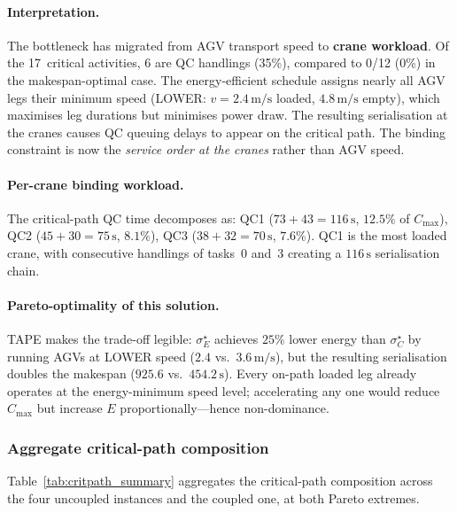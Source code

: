 \documentclass[11pt]{article}
\begin{document}
\smallskip
\paragraph{Interpretation.}
The bottleneck has migrated from AGV transport speed to \textbf{crane workload}. Of the
17~critical activities, 6 are QC handlings (35\%), compared to 0/12 (0\%) in the
makespan-optimal case. The energy-efficient schedule assigns nearly all AGV legs their
minimum speed (LOWER: $v=2.4\,\mathrm{m/s}$ loaded, $4.8\,\mathrm{m/s}$ empty), which
maximises leg durations but minimises power draw. The resulting serialisation at the cranes
causes QC queuing delays to appear on the critical path. The binding constraint is now
the \emph{service order at the cranes} rather than AGV speed.

\paragraph{Per-crane binding workload.}
The critical-path QC time decomposes as: QC1 ($73+43=116\,\mathrm{s}$, $12.5\%$ of
$C_{\max}$), QC2 ($45+30=75\,\mathrm{s}$, $8.1\%$), QC3 ($38+32=70\,\mathrm{s}$,
$7.6\%$). QC1 is the most loaded crane, with consecutive handlings of tasks~0 and~3
creating a $116\,\mathrm{s}$ serialisation chain.

\paragraph{Pareto-optimality of this solution.}
TAPE makes the trade-off legible: $\sigma^\star_E$ achieves $25\%$ lower energy than
$\sigma^\star_C$ by running AGVs at LOWER speed ($2.4$ vs.\ $3.6\,\mathrm{m/s}$), but the
resulting serialisation doubles the makespan ($925.6$ vs.\ $454.2\,\mathrm{s}$). Every
on-path loaded leg already operates at the energy-minimum speed level; accelerating any one
would reduce $C_{\max}$ but increase $E$ proportionally---hence non-dominance.

\subsubsection{Aggregate critical-path composition}

Table~\ref{tab:critpath_summary} aggregates the critical-path composition across the four
uncoupled instances and the coupled one, at both Pareto extremes.
\end{document}
